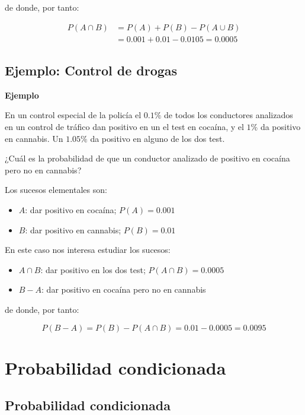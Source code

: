 \documentclass[]{book}
\providecommand{\tightlist}{%
  \setlength{\itemsep}{0pt}\setlength{\parskip}{0pt}}
\begin{document}
de donde, por tanto:

\[\begin{array}{rl}
{P(A\cap B)} &{=P(A)+P(B)-P(A\cup B)}\\ &{=0.001+0.01-0.0105=0.0005}
\end{array}\]

\hypertarget{ejemplo-control-de-drogas}{%
\subsection{Ejemplo: Control de drogas}\label{ejemplo-control-de-drogas}}

\textbf{Ejemplo}

En un control especial de la policía el \(0.1\%\) de todos los conductores analizados en un control de tráfico dan positivo en un el test en cocaína, y el \(1\%\) da positivo en cannabis. Un \(1.05\%\) da positivo en alguno de los dos test.

¿Cuál es la probabilidad de que un conductor analizado de positivo en cocaína pero no en cannabis?

Los sucesos elementales son:

\begin{itemize}
\tightlist
\item
  \(A\): dar positivo en cocaína; \(P(A)=0.001\)
\item
  \(B\): dar positivo en cannabis; \(P(B)=0.01\)
\end{itemize}

En este caso nos interesa estudiar los sucesos:

\begin{itemize}
\tightlist
\item
  \(A\cap B\): dar positivo en los dos test; \(P(A\cap B)=0.0005\)
\item
  \(B-A\): dar positivo en cocaína pero no en cannabis
\end{itemize}

de donde, por tanto:

\[P(B-A) =P(B)-P(A\cap B) =0.01-0.0005=0.0095\]

\hypertarget{probabilidad-condicionada}{%
\section{Probabilidad condicionada}\label{probabilidad-condicionada}}

\hypertarget{probabilidad-condicionada-1}{%
\subsection{Probabilidad condicionada}\label{probabilidad-condicionada-1}}
\end{document}
